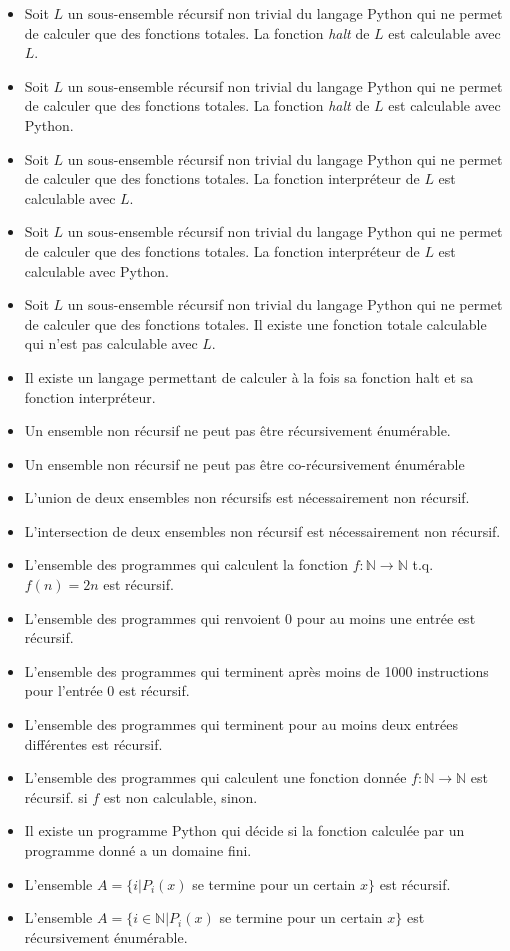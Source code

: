\begin{itemize}
\item Soit $L$ un sous-ensemble récursif non trivial du langage Python qui ne permet de calculer que des fonctions totales. La fonction \textit{halt} de $L$ est calculable avec $L$. 
\item Soit $L$ un sous-ensemble récursif non trivial du langage Python qui ne permet de calculer que des fonctions totales. La fonction \textit{halt} de $L$ est calculable avec Python. 
\item Soit $L$ un sous-ensemble récursif non trivial du langage Python qui ne permet de calculer que des fonctions totales. La fonction interpréteur de $L$ est calculable avec $L$. 
\item Soit $L$ un sous-ensemble récursif non trivial du langage Python qui ne permet de calculer que des fonctions totales. La fonction interpréteur de $L$ est calculable avec Python. 
\item Soit $L$ un sous-ensemble récursif non trivial du langage Python qui ne permet de calculer que des fonctions totales. Il existe une fonction totale calculable qui n'est pas calculable avec $L$. 
\item Il existe un langage permettant de calculer à la fois sa fonction halt et sa fonction interpréteur. 
\item Un ensemble non récursif ne peut pas être récursivement énumérable. 
\item Un ensemble non récursif ne peut pas être co-récursivement énumérable 
\item L'union de deux ensembles non récursifs est nécessairement non récursif. 
\item L'intersection de deux ensembles non récursif est nécessairement non récursif. 

\item L'ensemble des programmes qui calculent la fonction $f : \mathbb{N} \rightarrow \mathbb{N}$ t.q. $f(n) = 2n$ est récursif. 
\item L'ensemble des programmes qui renvoient 0 pour au moins une entrée est récursif. 
\item L'ensemble des programmes qui terminent après moins de 1000 instructions pour l'entrée 0 est récursif. 
\item L'ensemble des programmes qui terminent pour au moins deux entrées différentes est récursif. 
\item L'ensemble des programmes qui calculent une fonction donnée $f : \mathbb{N} \rightarrow \mathbb{N}$ est récursif.  si $f$ est non calculable,  sinon.
\item Il existe un programme Python qui décide si la fonction calculée par un programme donné a un domaine fini. 
\item L'ensemble $A = \{i | P_i(x)$ se termine pour un certain $x\}$ est récursif. 
\item L'ensemble $A = \{i \in \mathbb{N} | P_i(x)$ se termine pour un certain $x\}$ est récursivement énumérable. 
\end{itemize}

